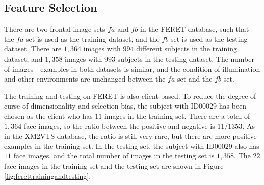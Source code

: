 \subsection{Feature Selection}
There are two frontal image sets $fa$ and $fb$ in the \mbox{FERET} database, such that the $fa$ set is used as the training dataset, and the $fb$ set is used as the testing dataset. There are $1,364$ images with $994$ different subjects in the training dataset, and $1,358$ images with $993$ subjects in the testing dataset. The number of images - examples in both datasets is similar, and the condition of illumination and other environments are unchanged between the $fa$ set and the $fb$ set.

The training and testing on \mbox{FERET} is also client-based. To reduce the degree of curse of dimensionality and selection bias, the subject with ID00029 has been chosen as the client who has $11$ images in the training set. There are a total of $1,364$ face images, so the ratio between the positive and negative is $11/1353$. As in the \mbox{XM2VTS} database, the ratio is still very rare, but there are more positive examples in the training set. In the testing set, the subject with ID00029 also has $11$ face images, and the total number of images in the testing set is $1,358$. The $22$ face images in the training set and the testing set are shown in \mbox{Figure} \ref{fig:ferettrainingandtesting}.
